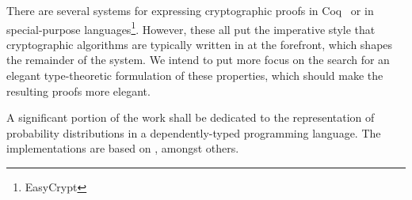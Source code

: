 There are several systems for expressing cryptographic proofs in Coq~\cite{fcf} or in special-purpose
languages\footnote{EasyCrypt}.  However, these all put the imperative style that cryptographic algorithms are typically
written in at the forefront, which shapes the remainder of the system.  We intend to put more focus on the search for an
elegant type-theoretic formulation of these properties, which should make the resulting proofs more elegant.

A significant portion of the work shall be dedicated to the representation of probability distributions in a
dependently-typed programming language.  The implementations are based on \cite{stochasticlambdacalculus}, amongst
others.
